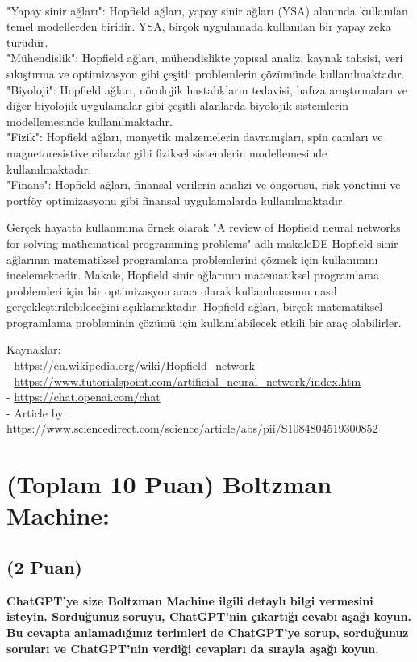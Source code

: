 \documentclass[11pt]{article}
\begin{document}
\\"Yapay sinir ağları": Hopfield ağları, yapay sinir ağları (YSA) alanında kullanılan temel modellerden biridir. YSA, birçok uygulamada kullanılan bir yapay zeka türüdür.
\\"Mühendislik": Hopfield ağları, mühendislikte yapısal analiz, kaynak tahsisi, veri sıkıştırma ve optimizasyon gibi çeşitli problemlerin çözümünde kullanılmaktadır.
\\"Biyoloji": Hopfield ağları, nörolojik hastalıkların tedavisi, hafıza araştırmaları ve diğer biyolojik uygulamalar gibi çeşitli alanlarda biyolojik sistemlerin modellemesinde kullanılmaktadır.
\\"Fizik": Hopfield ağları, manyetik malzemelerin davranışları, spin camları ve magnetoresistive cihazlar gibi fiziksel sistemlerin modellemesinde kullanılmaktadır.
\\"Finans": Hopfield ağları, finansal verilerin analizi ve öngörüsü, risk yönetimi ve portföy optimizasyonu gibi finansal uygulamalarda kullanılmaktadır.

Gerçek hayatta kullanımına örnek olarak "A review of Hopfield neural networks for solving mathematical programming problems" adlı makaleDE Hopfield sinir ağlarının matematiksel programlama problemlerini çözmek için kullanımını incelemektedir. Makale, Hopfield sinir ağlarının matematiksel programlama problemleri için bir optimizasyon aracı olarak kullanılmasının nasıl gerçekleştirilebileceğini açıklamaktadır.
Hopfield ağları, birçok matematiksel programlama probleminin çözümü için kullanılabilecek etkili bir araç olabilirler.

Kaynaklar:
\\ - \url{https://en.wikipedia.org/wiki/Hopfield\_network}
\\ - \url{https://www.tutorialspoint.com/artificial_neural_network/index.htm}
\\ - \url{https://chat.openai.com/chat}
\\ - Article by: \url{https://www.sciencedirect.com/science/article/abs/pii/S1084804519300852}

\section{(Toplam 10 Puan) Boltzman Machine:}

\subsection{(2 Puan)} \textbf{ChatGPT’ye size Boltzman Machine ilgili detaylı bilgi vermesini isteyin. Sorduğunuz soruyu, ChatGPT'nin çıkartığı cevabı aşağı koyun. Bu cevapta anlamadığınız terimleri de ChatGPT’ye sorup, sorduğunuz soruları ve ChatGPT’nin verdiği cevapları da sırayla aşağı koyun.}
\end{document}
